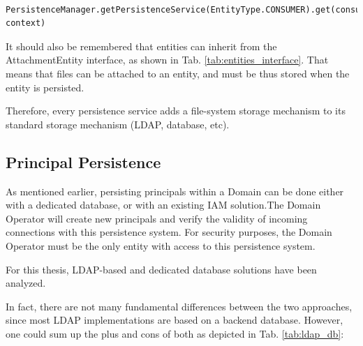 \lstset{language=Java}
\begin{lstlisting}
	PersistenceManager.getPersistenceService(EntityType.CONSUMER).get(consumerID, context)
\end{lstlisting}


It should also be  remembered that entities can inherit from the AttachmentEntity interface, as shown in Tab. \ref{tab:entities_interface}. That means that files can be attached to an entity, and must be thus stored when the entity is persisted. 

Therefore, every persistence service adds a file-system storage mechanism to its standard storage mechanism (LDAP, database, etc).

\subsection{Principal Persistence}

As mentioned earlier, persisting principals within a Domain can be done either with a dedicated database, or with an existing IAM solution.The Domain Operator will create new principals and verify the validity of incoming connections with this persistence system. For security purposes, the Domain Operator must be the only entity with access to this persistence system.

For this thesis, LDAP-based and dedicated database solutions have been analyzed. 

In fact, there are not many fundamental differences between the two approaches, since most LDAP implementations are based on a backend database. However, one could sum up the plus and cons of both as depicted in Tab. \ref{tab:ldap_db}:

